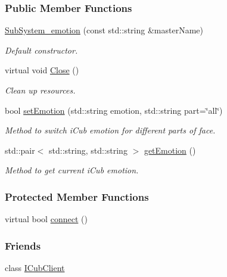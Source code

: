 \subsubsection*{Public Member Functions}
\begin{DoxyCompactItemize}
\item 
\hyperlink{group__icubclient__subsystems_aa5edf05eb54ad2fe7d8068c8336d902f}{Sub\+System\+\_\+emotion} (const std\+::string \&master\+Name)
\begin{DoxyCompactList}\small\item\em Default constructor. \end{DoxyCompactList}\item 
virtual void \hyperlink{group__icubclient__subsystems_a44727eb284e1291c193559d9ecc12a50}{Close} ()
\begin{DoxyCompactList}\small\item\em Clean up resources. \end{DoxyCompactList}\item 
bool \hyperlink{group__icubclient__subsystems_ac16bc529539e92565e0bdf957b3e57c2}{set\+Emotion} (std\+::string emotion, std\+::string part=\char`\"{}all\char`\"{})
\begin{DoxyCompactList}\small\item\em Method to switch i\+Cub emotion for different parts of face. \end{DoxyCompactList}\item 
std\+::pair$<$ std\+::string, std\+::string $>$ \hyperlink{group__icubclient__subsystems_ad90b6e7e287e41f8fcdb70937cf51c37}{get\+Emotion} ()
\begin{DoxyCompactList}\small\item\em Method to get current i\+Cub emotion. \end{DoxyCompactList}\end{DoxyCompactItemize}
\subsubsection*{Protected Member Functions}
\begin{DoxyCompactItemize}
\item 
virtual bool \hyperlink{group__icubclient__subsystems_af55715ece8170cb63fc2546f2bdcfcf1}{connect} ()
\end{DoxyCompactItemize}
\subsubsection*{Friends}
\begin{DoxyCompactItemize}
\item 
class \hyperlink{group__icubclient__subsystems_a56c42753f30380d8abf4a96bc322b3b0}{I\+Cub\+Client}
\end{DoxyCompactItemize}
